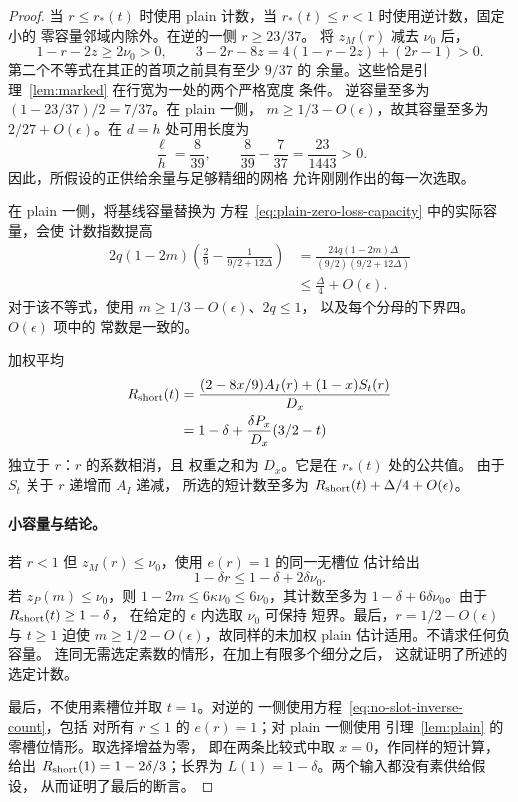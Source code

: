 \begin{proof}
当 \(r\le r_*(t)\) 时使用 plain 计数，当
\(r_*(t)\le r<1\) 时使用逆计数，固定小的
零容量邻域内除外。在逆的一侧 \(r\ge23/37\)。
将 \(z_M(r)\) 减去 \(\nu_0\) 后，
\[
 1-r-2z\ge2\nu_0>0,\qquad
 3-2r-8z=4(1-r-2z)+(2r-1)>0.
\]
第二个不等式在其正的首项之前具有至少 \(9/37\) 的
余量。这些恰是引理~\ref{lem:marked} 在行宽为一处的两个严格宽度
条件。
逆容量至多为
\((1-23/37)/2=7/37\)。在 plain 一侧，
\(m\ge1/3-O(\epsilon)\)，故其容量至多为
\(2/27+O(\epsilon)\)。在 \(d=h\) 处可用长度为
\[
 \frac{\ell}{h}=\frac8{39},\qquad
 \frac8{39}-\frac7{37}=\frac{23}{1443}>0.
\]
因此，所假设的正供给余量与足够精细的网格
允许刚刚作出的每一次选取。

在 plain 一侧，将基线容量替换为
方程~\eqref{eq:plain-zero-loss-capacity} 中的实际容量，会使
计数指数提高
\begin{equation}
 \begin{split}
 2q(1-2m)
 \left(\frac29-\frac1{9/2+12\Delta}\right)
 &=\frac{24q(1-2m)\Delta}{(9/2)(9/2+12\Delta)}\\
 &\le\frac{\Delta}{4}+O(\epsilon).
 \end{split}
 \label{eq:capacity-comparison}
\end{equation}
对于该不等式，使用 \(m\ge1/3-O(\epsilon)\)、\(2q\le1\)，
以及每个分母的下界四。\(O(\epsilon)\) 项中的
常数是一致的。

加权平均
\begin{equation}
 \begin{aligned}
 R_{\rm short}(t)
 &=\frac{(2-8x/9)A_I(r)+(1-x)S_t(r)}{D_x}\\
 &=1-\delta+\frac{\delta P_x}{D_x}(3/2-t)
 \end{aligned}
 \label{eq:short-crossing-count}
\end{equation}
独立于 \(r\)：\(r\) 的系数相消，且
权重之和为 \(D_x\)。它是在 \(r_*(t)\) 处的公共值。
由于 \(S_t\) 关于 \(r\) 递增而 \(A_I\) 递减，
所选的短计数至多为 \(R_{\rm short}(t)+\Delta/4+O(\epsilon)\)。

\paragraph{小容量与结论。}
若 \(r<1\) 但 \(z_M(r)\le\nu_0\)，使用 \(e(r)=1\) 的同一无槽位
估计给出
\[
 1-\delta r\le1-\delta+2\delta\nu_0.
\]
若 \(z_P(m)\le\nu_0\)，则
\(1-2m\le6\kappa\nu_0\le6\nu_0\)，其计数至多为
\(1-\delta+6\delta\nu_0\)。由于 \(R_{\rm short}(t)\ge1-\delta\)，
在给定的 \(\epsilon\) 内选取 \(\nu_0\) 可保持
短界。最后，\(r=1/2-O(\epsilon)\) 与 \(t\ge1\)
迫使 \(m\ge1/2-O(\epsilon)\)，故同样的未加权 plain
估计适用。不请求任何负容量。
连同无需选定素数的情形，在加上有限多个细分之后，
这就证明了所述的选定计数。

最后，不使用素槽位并取 \(t=1\)。对逆的
一侧使用方程~\eqref{eq:no-slot-inverse-count}，包括
对所有 \(r\le1\) 的 \(e(r)=1\)；对 plain 一侧使用
引理~\ref{lem:plain} 的零槽位情形。取选择增益为零，
即在两条比较式中取 \(x=0\)，作同样的短计算，
给出 \(R_{\rm short}(1)=1-2\delta/3\)；长界为
\(L(1)=1-\delta\)。两个输入都没有素供给假设，
从而证明了最后的断言。
\end{proof}

